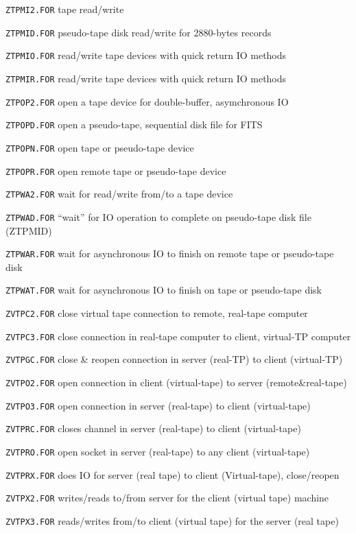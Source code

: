 {\item{\tt ZTPMI2.FOR} tape read/write
\item{\tt ZTPMID.FOR} pseudo-tape disk read/write for 2880-bytes records
\item{\tt ZTPMIO.FOR} read/write tape devices with quick return IO methods
\item{\tt ZTPMIR.FOR} read/write tape devices with quick return IO methods
\item{\tt ZTPOP2.FOR} open a tape device for double-buffer, asymchronous IO
\item{\tt ZTPOPD.FOR} open a pseudo-tape, sequential disk file for FITS
\item{\tt ZTPOPN.FOR} open tape or pseudo-tape device
\item{\tt ZTPOPR.FOR} open  remote tape or pseudo-tape device
\item{\tt ZTPWA2.FOR} wait for read/write from/to a tape device
\item{\tt ZTPWAD.FOR} ``wait'' for IO operation to complete on pseudo-tape disk file (ZTPMID)
\item{\tt ZTPWAR.FOR} wait for asynchronous IO to finish on remote tape or pseudo-tape disk
\item{\tt ZTPWAT.FOR} wait for asynchronous IO to finish on tape or pseudo-tape disk
\item{\tt ZVTPC2.FOR} close virtual tape connection to remote, real-tape computer
\item{\tt ZVTPC3.FOR} close connection in real-tape computer to client, virtual-TP computer
\item{\tt ZVTPGC.FOR} close \& reopen connection in server (real-TP) to client (virtual-TP)
\item{\tt ZVTPO2.FOR} open connection in client (virtual-tape) to server (remote\&real-tape)
\item{\tt ZVTPO3.FOR} open connection in server (real-tape) to client (virtual-tape)
\item{\tt ZVTPRC.FOR} closes channel in server (real-tape) to client (virtual-tape)
\item{\tt ZVTPRO.FOR} open socket in server (real-tape) to any client (virtual-tape)
\item{\tt ZVTPRX.FOR} does IO for server (real tape) to client (Virtual-tape), close/reopen
\item{\tt ZVTPX2.FOR} writes/reads to/from server for the client (virtual tape) machine
\item{\tt ZVTPX3.FOR} reads/writes from/to client (virtual tape) for the server (real tape)

}
